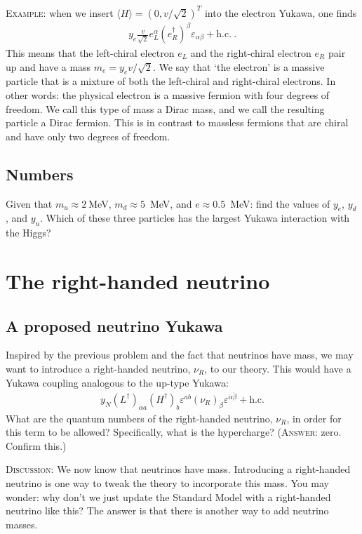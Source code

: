 \documentclass[12pt]{article}
\numberwithin{equation}{section}    %
\begin{document}
\textsc{Example}: when we insert $\langle H\rangle = (0, v/\sqrt{2})^T$ into the electron Yukawa, one finds
\begin{align}
	y_e\frac{v}{\sqrt{2}} e_L^\alpha \left(e_R^\dag \right)^\beta \varepsilon_{\alpha\beta} + \text{h.c.} \ .
\end{align}
This means that the left-chiral electron $e_L$ and the right-chiral electron $e_R$ pair up and have a mass $m_e = y_e v/\sqrt{2}$. We say that `the electron' is a massive particle that is a mixture of both the left-chiral and right-chiral electrons. In other words: the physical electron is a massive fermion with four degrees of freedom. We call this type of mass a Dirac mass, and we call the resulting particle a Dirac fermion. This is in contrast to massless fermions that are chiral and have only two degrees of freedom. 

\subsection{Numbers}

Given that $m_u \approx 2~$MeV, $m_d\approx 5$~MeV, and $e\approx 0.5$~MeV: find the values of $y_e$, $y_d$, and $y_u$. Which of these three particles has the largest Yukawa interaction with the Higgs?


\section{The right-handed neutrino}

\subsection{A proposed neutrino Yukawa}

Inspired by the previous problem and the fact that neutrinos have mass, we may want to introduce a right-handed neutrino, $\nu_R$, to our theory. This would have a Yukawa coupling analogous to the up-type Yukawa:
\begin{align}
	y_N  \left(L^\dag\right)_{\dot{\alpha}a} \left(H^\dag\right)_b \varepsilon^{ab} \left(\nu_R\right)_{\dot{\beta}}\varepsilon^{\dot{\alpha}\dot{\beta}}
	+ \text{h.c.}
\end{align}
What are the quantum numbers of the right-handed neutrino, $\nu_R$, in order for this term to be allowed? Specifically, what is the hypercharge? (\textsc{Answer}: zero. Confirm this.)

\textsc{Discussion:} We now know that neutrinos have mass. Introducing a right-handed neutrino is one way to tweak the theory to incorporate this mass. You may wonder: why don't we just update the Standard Model with a right-handed neutrino like this? The answer is that there is another way to add neutrino masses. 
\end{document}
